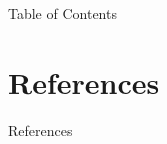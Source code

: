 \documentclass[
  rgb,
  size=14pt,
  paper=smartboard,
  display=slides,
  style=tuliplab,
  pauseslide,
  fleqn,
  leqno]{powerdot}
\begin{document}
\maketitle

\begin{slide}[toc=,bm=]{Table of Contents}
  \tableofcontents[type=1,content=futuresections]
\end{slide}



\section{References}

\begin{slide}[toc=,bm=]{References}
  
  \footnotesize
  
\end{slide}


\end{document}
